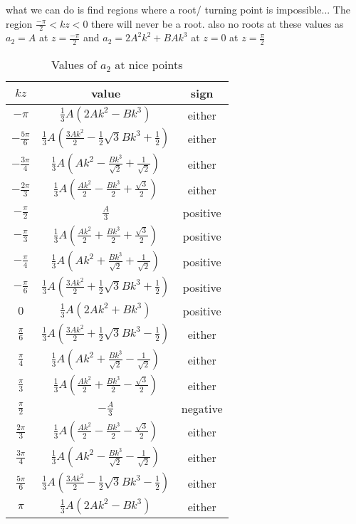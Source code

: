 \documentclass[12pt]{article}
\begin{document}
what we can do is find regions where a root/ turning point is impossible...
The region $\frac{-\pi}{2}<kz< 0$ there will never be a root. also no roots at these values as $a_2 = A$ at $z=\frac{-\pi}{2}$ and $a_2 = 2A^2k^2+BAk^3$ at $z=0$ at $z= \frac{\pi}{2}$ 
\begin{table}[H]
	\centering
	\caption{Values of $a_2$ at nice points}
	\begin{tabular}{|c|c|c|}
		\hline
		$kz$ &value& sign\\
		\hline
	$-\pi$&$\frac{1}{3} A \left(2 A k^2-B k^3\right)$&either\\$-\frac{5\pi}{6}$&$\frac{1}{3} A \left(\frac{3 A
		k^2}{2}-\frac{1}{2} \sqrt{3} B k^3+\frac{1}{2}\right)$& either\\
	$-\frac{3\pi}{4}$&$\frac{1}{3} A \left(A k^2-\frac{Bk^3}{\sqrt{2}}+\frac{1}{\sqrt{2}}\right)$&either\\
	$-\frac{2\pi}{3}$&$\frac{1}{3} A \left(\frac{A
		k^2}{2}-\frac{B k^3}{2}+\frac{\sqrt{3}}{2}\right)$& either\\$-\frac{\pi}{2}$&$\frac{A}{3}$&positive\\ $-\frac{\pi}{3}$& $\frac{1}{3} A
	\left(\frac{A k^2}{2}+\frac{B k^3}{2}+\frac{\sqrt{3}}{2}\right)$& positive\\$-\frac{\pi}{4}$&$\frac{1}{3} A \left(A k^2+\frac{B
		k^3}{\sqrt{2}}+\frac{1}{\sqrt{2}}\right)$& positive\\$-\frac{\pi}{6}$&$\frac{1}{3} A
	\left(\frac{3 A k^2}{2}+\frac{1}{2} \sqrt{3} B k^3+\frac{1}{2}\right)$& positive\\ $0$&$\frac{1}{3} A
	\left(2 A k^2+B k^3\right)$& positive\\$\frac{\pi}{6}$&$\frac{1}{3} A \left(\frac{3 A k^2}{2}+\frac{1}{2} \sqrt{3}B k^3-\frac{1}{2}\right)$& either\\$\frac{\pi}{4}$& $\frac{1}{3} A \left(A k^2+\frac{B
		k^3}{\sqrt{2}}-\frac{1}{\sqrt{2}}\right)$&either\\$\frac{\pi}{3}$&$\frac{1}{3} A \left(\frac{A k^2}{2}+\frac{B
		k^3}{2}-\frac{\sqrt{3}}{2}\right)$&either\\$\frac{\pi}{2}$&$-\frac{A}{3}$& negative\\$\frac{2\pi}{3}$&$\frac{1}{3} A \left(\frac{A
		k^2}{2}-\frac{B k^3}{2}-\frac{\sqrt{3}}{2}\right)$&either\\
	$\frac{3\pi}{4}$& $\frac{1}{3} A \left(A k^2-\frac{Bk^3}{\sqrt{2}}-\frac{1}{\sqrt{2}}\right)$& either\\
	$\frac{5\pi}{6}$&$\frac{1}{3} A \left(\frac{3 A
		k^2}{2}-\frac{1}{2} \sqrt{3} B k^3-\frac{1}{2}\right)$&either\\$\pi$&$\frac{1}{3} A \left(2 A k^2-B
	k^3\right)$& either
		\\ \hline
	\end{tabular}
\end{table}
\end{document}

